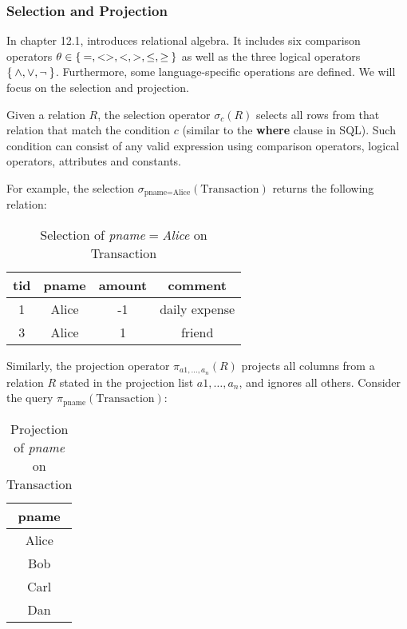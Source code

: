 \subsubsection{Selection and Projection}

In chapter 12.1, \cite{Halp08}
introduces relational algebra. It includes six
comparison operators $\theta \in \Set{=, <>, <, >, \leq, \geq}$ as well as the
three logical operators $\Set{\land, \lor, \neg}$. Furthermore, some
language-specific operations are defined. We will focus on the selection and projection.

Given a relation $R$, the selection operator $\sigma_c(R)$ selects all rows from
that relation that match the condition $c$ (similar to the \textbf{where} clause in \gls{SQL}).
Such condition can consist of any valid
expression using comparison operators, logical operators, attributes and constants.

For example, the selection $\sigma_{\text{pname}=\text{Alice}}(\text{Transaction})$
returns the following relation:

\begin{table}[htbp]
    \centering
    \begin{tabular}{|c|c|c|c|}
        \hline
        tid     & pname & amount    & comment \\ \hline\hline
        1       & Alice & -1        & daily expense \\ \hline
        3       & Alice & 1         & friend\\ \hline
    \end{tabular}
    \caption{Selection of \textit{pname$=$Alice} on Transaction}
    \label{Selection of pname=Alice}
\end{table}

Similarly, the projection operator $\pi_{a1, \dots, a_n}(R)$ projects all columns
from a relation $R$ stated in the projection list $a1, \dots, a_n$, and
ignores all others. Consider the query $\pi_{\text{pname}}(\text{Transaction})$:

\begin{table}[htbp]
    \centering
    \begin{tabular}{|c|}
        \hline
        pname \\ \hline\hline
        Alice \\ \hline
        Bob   \\ \hline
        Carl  \\ \hline
        Dan   \\ \hline
    \end{tabular}
    \caption{Projection of \textit{pname} on Transaction}
    \label{Projection of pname}
\end{table}

